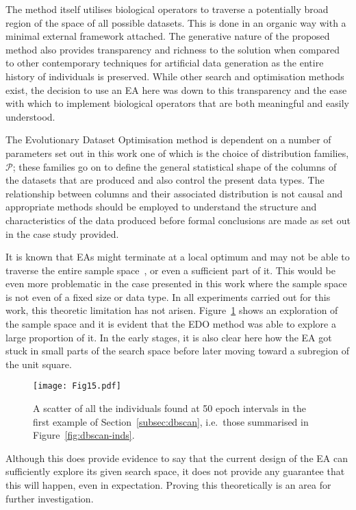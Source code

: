The method itself utilises biological operators to traverse a potentially broad
region of the space of all possible datasets. This is done in an organic way
with a minimal external framework attached. The generative nature of the
proposed method also provides transparency and richness to the solution when
compared to other contemporary techniques for artificial data generation as the
entire history of individuals is preserved. While other search and optimisation
methods exist, the decision to use an EA here was down to this transparency and
the ease with which to implement biological operators that are both meaningful
and easily understood.

The Evolutionary Dataset Optimisation method is dependent on a number of
parameters set out in this work one of which is the choice of distribution
families, \(\mathcal{P}\); these families go on to define the general
statistical shape of the columns of the datasets that are produced and also
control the present data types. The relationship between columns and their
associated distribution is not causal and appropriate methods should be employed
to understand the structure and characteristics of the data produced before
formal conclusions are made as set out in the case study provided.

It is known that EAs might terminate at a local optimum and may not be able to
traverse the entire sample space~\cite{Vikhar2016}, or even a sufficient part of
it. This would be even more problematic in the case presented in this work where
the sample space is not even of a fixed size or data type. In all experiments
carried out for this work, this theoretic limitation has not arisen.
Figure~\ref{fig:coverage} shows an exploration of the sample space and it is
evident that the EDO method was able to explore a large proportion of it. In the
early stages, it is also clear here how the EA got stuck in small parts of the
search space before later moving toward a subregion of the unit square.

\begin{figure}[htbp]
    \texttt{[image: Fig15.pdf]}
    \caption{%
        A scatter of all the individuals found at 50 epoch intervals in the
        first example of Section~\ref{subsec:dbscan}, i.e.\ those summarised in
        Figure~\ref{fig:dbscan-inds}.
    }\label{fig:coverage}
\end{figure}

Although this does provide evidence to say that the current design of the EA can
sufficiently explore its given search space, it does not provide any guarantee
that this will happen, even in expectation. Proving this theoretically is an
area for further investigation.

